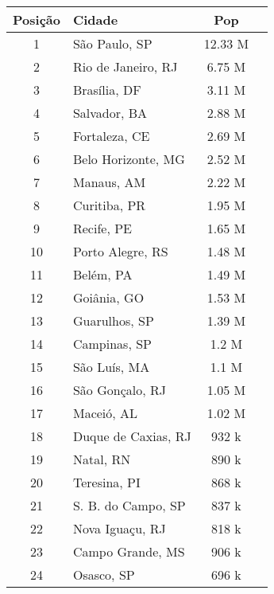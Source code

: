 \documentclass[12pt]{article}
\begin{document}
\begin{enumerate}[label=\textbf{Q\arabic*}]
\begin{minipage}{0.50\textwidth}
              \begin{tabular}{@{}clcr@{}}
                  \toprule
                  Posição & Cidade              & Pop     \\
                  \midrule
                  1       & São Paulo, SP       & 12.33 M \\
                  2       & Rio de Janeiro, RJ  & 6.75 M  \\
                  3       & Brasília, DF        & 3.11 M  \\
                  4       & Salvador, BA        & 2.88 M  \\
                  5       & Fortaleza, CE       & 2.69 M  \\
                  6       & Belo Horizonte, MG  & 2.52 M  \\
                  7       & Manaus, AM          & 2.22 M  \\
                  8       & Curitiba, PR        & 1.95 M  \\
                  9       & Recife, PE          & 1.65 M  \\
                  10      & Porto Alegre, RS    & 1.48 M  \\
                  11      & Belém, PA           & 1.49 M  \\
                  12      & Goiânia, GO         & 1.53 M  \\
                  13      & Guarulhos, SP       & 1.39 M  \\
                  14      & Campinas, SP        & 1.2 M   \\
                  15      & São Luís, MA        & 1.1 M   \\
                  16      & São Gonçalo, RJ     & 1.05 M  \\
                  17      & Maceió, AL          & 1.02 M  \\
                  18      & Duque de Caxias, RJ & 932 k   \\
                  19      & Natal, RN           & 890 k   \\
                  20      & Teresina, PI        & 868 k   \\
                  21      & S. B. do Campo, SP  & 837 k   \\
                  22      & Nova Iguaçu, RJ     & 818 k   \\
                  23      & Campo Grande, MS    & 906 k   \\
                  24      & Osasco, SP          & 696 k   \\

\end{tabular}
\end{minipage}
\end{enumerate}
\end{document}
